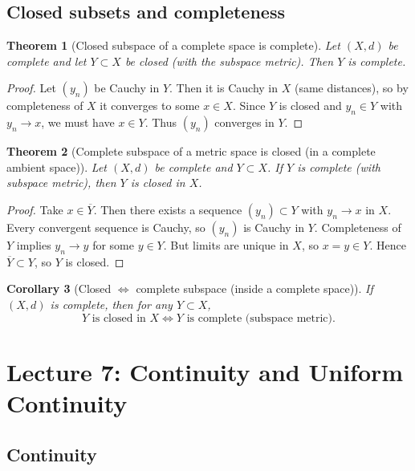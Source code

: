 \documentclass[11pt]{article}
\newtheorem{theorem}{Theorem}[section]
\newtheorem{corollary}[theorem]{Corollary}
\theoremstyle{definition}
\newcommand{\ol}[1]{\overline{#1}}
\begin{document}
\subsection{Closed subsets and completeness}

\begin{theorem}[Closed subspace of a complete space is complete]
Let $(X,d)$ be complete and let $Y\subset X$ be closed (with the subspace metric). Then $Y$ is complete.
\end{theorem}

\begin{proof}
Let $(y_n)$ be Cauchy in $Y$. Then it is Cauchy in $X$ (same distances), so by completeness of $X$ it converges to some $x\in X$.
Since $Y$ is closed and $y_n\in Y$ with $y_n\to x$, we must have $x\in Y$.
Thus $(y_n)$ converges in $Y$.
\end{proof}

\begin{theorem}[Complete subspace of a metric space is closed (in a complete ambient space)]
Let $(X,d)$ be complete and $Y\subset X$. If $Y$ is complete (with subspace metric), then $Y$ is closed in $X$.
\end{theorem}

\begin{proof}
Take $x\in\ol Y$. Then there exists a sequence $(y_n)\subset Y$ with $y_n\to x$ in $X$.
Every convergent sequence is Cauchy, so $(y_n)$ is Cauchy in $Y$. Completeness of $Y$ implies $y_n\to y$ for some $y\in Y$.
But limits are unique in $X$, so $x=y\in Y$. Hence $\ol Y\subset Y$, so $Y$ is closed.
\end{proof}

\begin{corollary}[Closed $\iff$ complete subspace (inside a complete space)]
If $(X,d)$ is complete, then for any $Y\subset X$,
\[
Y\text{ is closed in }X \iff Y\text{ is complete (subspace metric)}.
\]
\end{corollary}

\section{Lecture 7: Continuity and Uniform Continuity}

\subsection{Continuity}
\end{document}
